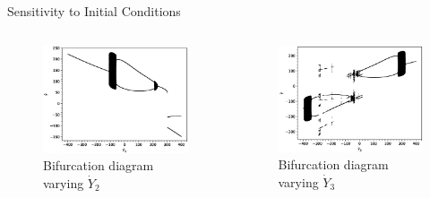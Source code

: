 \documentclass{beamer}
\begin{document}
\begin{frame}{Sensitivity to Initial Conditions}
	\begin{columns}
	\begin{column}{0.5\textwidth}
		\begin{figure}
			\centering
			\includegraphics[width=1.2\textwidth]{y2bifurcation.eps}
			\caption{Bifurcation diagram varying $\dot Y_2$}
		\end{figure}
	\end{column}
	\begin{column}{0.5\textwidth}
		\begin{figure}
			\centering
			\includegraphics[width=1.2\textwidth]{y3bifurcation.eps}
			\caption{Bifurcation diagram varying $\dot Y_3$}
		\end{figure}
	\end{column}
	\end{columns}
\end{frame}
\end{document}
